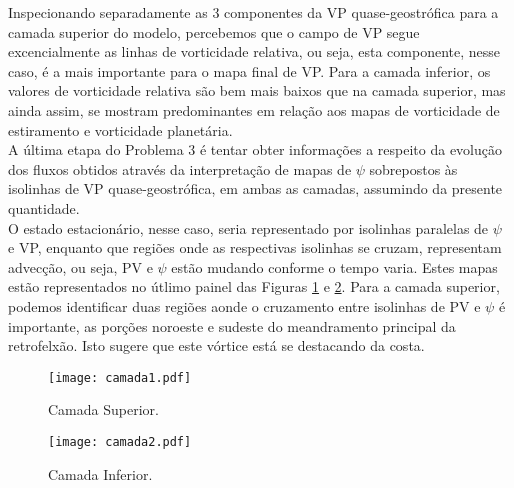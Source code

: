 \documentclass[12pt,portuguese,a4paper,pdftex]{article}
\renewcommand{\baselinestretch}{1.5}
\begin{document}
Inspecionando separadamente as 3 componentes da VP quase-geostrófica para a camada superior do modelo, percebemos que o campo de VP segue excencialmente as linhas de vorticidade relativa, ou seja, esta componente, nesse caso, é a mais importante para o mapa final de VP. Para a camada inferior, os valores de vorticidade relativa são bem mais baixos que na camada superior, mas  ainda assim, se mostram predominantes em relação aos mapas de vorticidade de estiramento e vorticidade planetária.\\

A última etapa do Problema 3 é tentar obter informações a respeito da evolução dos fluxos obtidos através da interpretação de mapas de $\psi$ sobrepostos às isolinhas de VP quase-geostrófica, em ambas as camadas, assumindo da presente quantidade. \\

O estado estacionário, nesse caso, seria representado por isolinhas paralelas de $\psi$ e VP, enquanto que regiões onde as respectivas isolinhas se cruzam, representam advecção, ou seja, PV e $\psi$ estão mudando conforme o tempo varia. Estes mapas estão representados no útlimo painel das Figuras \ref{fig:cam1} e \ref{fig:cam2}. Para a camada superior, podemos identificar duas regiões aonde o cruzamento entre isolinhas de PV e $\psi$ é importante, as porções noroeste e sudeste do meandramento principal da retrofelxão. Isto sugere que este vórtice está se destacando da costa. 

\begin{figure}[ht]
\begin{center}
\texttt{[image: camada1.pdf]}
\end{center}
\vspace{-0.5cm}
\renewcommand{\baselinestretch}{.5}
\caption{\label{fig:cam1} \small{Camada Superior.}}
\end{figure}

\begin{figure}[ht]
\begin{center}
\texttt{[image: camada2.pdf]}
\end{center}
\vspace{-0.5cm}
\renewcommand{\baselinestretch}{.5}
\caption{\label{fig:cam2} \small{Camada Inferior.}}
\end{figure}
\end{document}
